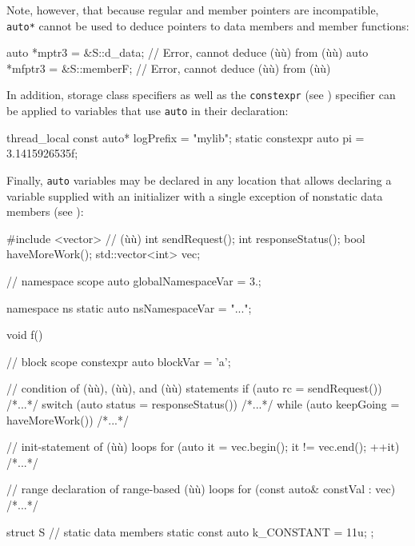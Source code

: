 \noindent Note, however, that because regular and member pointers are
incompatible, \lstinline!auto*! cannot be used to deduce pointers to data
members and member functions:

\begin{emcppslisting}[emcppsbatch=e2]
auto *mptr3  = &S::d_data;   // Error, cannot deduce (ù{}ù) from (ù{}ù)
auto *mfptr3 = &S::memberF;  // Error, cannot deduce (ù{}ù) from (ù{}ù)
\end{emcppslisting}
    
\noindent In addition, storage class specifiers as well as the \lstinline!constexpr!
(see ) specifier can be
applied to variables that use \lstinline!auto! in their declaration:

\begin{emcppslisting}
thread_local     const auto* logPrefix = "mylib";
static constexpr       auto  pi        = 3.1415926535f;
\end{emcppslisting}
    
\noindent Finally, \lstinline!auto! variables may be declared in any location that
allows declaring a variable supplied with an initializer with a single
exception of nonstatic data members (see ):


\begin{emcppshiddenlisting}[emcppsbatch=e3]
#include <vector>     // (ù{}ù)
int sendRequest();
int responseStatus();
bool haveMoreWork();
std::vector<int> vec;
\end{emcppshiddenlisting}
\begin{emcppslisting}[emcppsbatch=e3]
// namespace scope
auto globalNamespaceVar = 3.;

namespace ns
{
    static auto nsNamespaceVar = "...";
}

void f()
{
    // block scope
    constexpr auto blockVar = 'a';

    // condition of (ù{}ù), (ù{}ù), and (ù{}ù) statements
    if     (auto rc        = sendRequest())    { /*...*/ }
    switch (auto status    = responseStatus()) { /*...*/ }
    while  (auto keepGoing = haveMoreWork())   { /*...*/ }

    // init-statement of (ù{}ù) loops
    for (auto it = vec.begin(); it != vec.end(); ++it) { /*...*/ }

    // range declaration of range-based (ù{}ù) loops
    for (const auto& constVal : vec) { /*...*/ }
}

struct S
{
    // static data members
    static const auto k_CONSTANT = 11u;
};
\end{emcppslisting}
    

